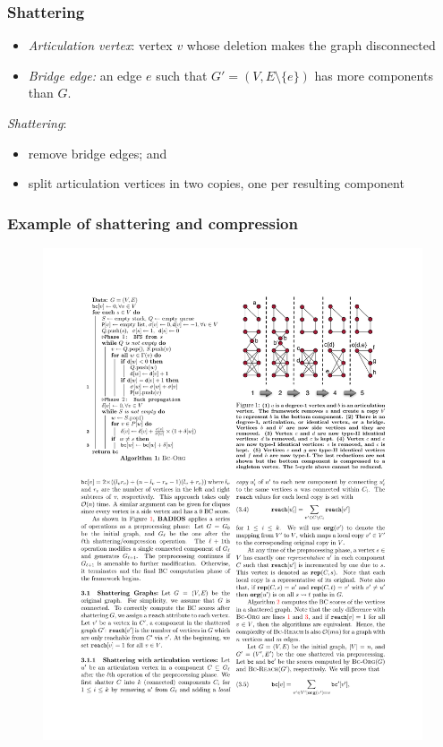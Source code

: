 \begin{frame}
  \frametitle{Shattering}
  \vfill
  \begin{itemize}
    \item \emph{Articulation vertex}: vertex $v$ whose deletion makes the graph disconnected
    \item \emph{Bridge edge:} an edge $e$ such that $G'=(V,E\setminus\{e\})$ has
      more components than $G$.
  \end{itemize}
  \pause
  \vfill
  \emph{Shattering}:
  \begin{itemize}
    \item remove bridge edges; and
    \item split articulation vertices in two copies, one per resulting component
  \end{itemize}
\end{frame}

\begin{frame}
  \frametitle{Example of shattering and compression}
  \begin{figure}
    \includegraphics{imgs/shatteringbadios.pdf}
  \end{figure}
\end{frame}

